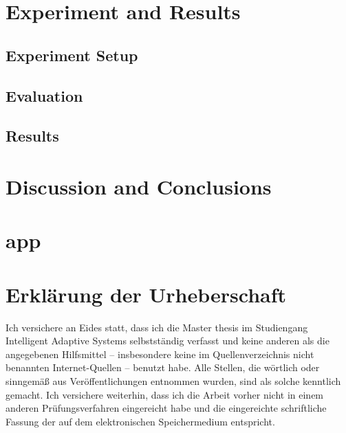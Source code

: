 \documentclass[12pt,final,twoside]{report}
\newcommand{\trtype}{Master thesis} %
\newcommand{\trcourseofstudies}{Intelligent Adaptive Systems} %
\theoremstyle{plain}
\theoremstyle{definition}
\theoremstyle{remark}
\begin{document}
\cleardoublepage
\chapter{Experiment and Results}
\section{Experiment Setup}

\section{Evaluation}
\section{Results}

\cleardoublepage
\chapter{Discussion and Conclusions}

\cleardoublepage
\appendix
\fancyhead[LO,RE]{}                      %

\chapter{app}

\cleardoublepage



\cleardoublepage

\vspace{2cm}
\chapter*{Erkl\"arung der Urheberschaft}
Ich versichere an Eides statt, dass ich die \trtype{} im Studiengang \trcourseofstudies{} selbstst\"andig verfasst und keine anderen als die angegebenen Hilfsmittel -- insbesondere keine im Quellenverzeichnis nicht benannten Internet-Quellen -- benutzt habe. Alle Stellen, die w\"ortlich oder sinngem\"a{\ss} aus Ver\"offentlichungen entnommen wurden, sind als solche kenntlich gemacht. Ich versichere weiterhin, dass ich die Arbeit vorher nicht in einem anderen Pr\"ufungsverfahren eingereicht habe und die eingereichte schriftliche Fassung der auf dem elektronischen Speichermedium entspricht.
\end{document}
